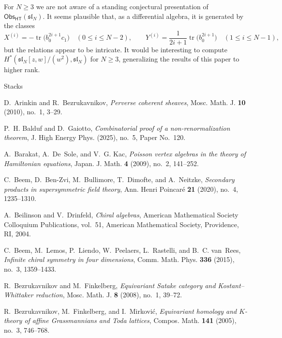 \documentclass[11pt]{amsart}
\numberwithin{equation}{section}
\theoremstyle{definition}
\theoremstyle{remark}
\newcommand{\Obs}{\mathsf{Obs}_{\mathsf{HT}}}
\begin{document}
For $N\ge3$ we are not aware of a standing conjectural presentation of $\Obs(\mathfrak{sl}_N)$. It seems plausible that, as a differential algebra, it is generated by the classes
\begin{equation}\label{eq:finite-generators}
X^{(i)}=-\operatorname{tr}\bigl(b_0^{2i+1}c_1\bigr)\quad(0\le i\le N-2),\qquad Y^{(i)}=\frac1{2i+1}\operatorname{tr}\bigl(b_0^{2i+1}\bigr)\quad(1\le i\le N-1),
\end{equation}
but the relations appear to be intricate. It would be interesting to compute $H^*(\mathfrak{sl}_N[z,w]/(w^2),\mathfrak{sl}_N)$ for $N\ge3$, generalizing the results of this paper to higher rank.

\begin{thebibliography}{Stacks}

D.~Arinkin and R.~Bezrukavnikov, \emph{Perverse coherent sheaves}, Mosc. Math. J. \textbf{10} (2010), no.~1, 3--29.

P.~H. Balduf and D.~Gaiotto, \emph{Combinatorial proof of a non-renormalization theorem}, J. High Energy Phys. (2025), no.~5, Paper No.~120.

A.~Barakat, A.~De~Sole, and V.~G. Kac, \emph{Poisson vertex algebras in the theory of Hamiltonian equations}, Japan. J. Math. \textbf{4} (2009), no.~2, 141--252.

C.~Beem, D.~Ben-Zvi, M.~Bullimore, T.~Dimofte, and A.~Neitzke, \emph{Secondary products in supersymmetric field theory}, Ann. Henri Poincar\'e \textbf{21} (2020), no.~4, 1235--1310.

A.~Beilinson and V.~Drinfeld, \emph{Chiral algebras}, American Mathematical Society Colloquium Publications, vol.~51, American Mathematical Society, Providence, RI, 2004.

C.~Beem, M.~Lemos, P.~Liendo, W.~Peelaers, L.~Rastelli, and B.~C. van~Rees, \emph{Infinite chiral symmetry in four dimensions}, Comm. Math. Phys. \textbf{336} (2015), no.~3, 1359--1433.

R.~Bezrukavnikov and M.~Finkelberg, \emph{Equivariant Satake category and Kostant--Whittaker reduction}, Mosc. Math. J. \textbf{8} (2008), no.~1, 39--72.

R.~Bezrukavnikov, M.~Finkelberg, and I.~Mirkovi\'c, \emph{Equivariant homology and $K$-theory of affine Grassmannians and Toda lattices}, Compos. Math. \textbf{141} (2005), no.~3, 746--768.


\end{thebibliography}
\end{document}
